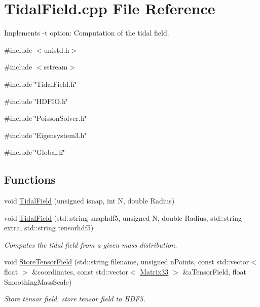 \section{TidalField.cpp File Reference}
\label{TidalField_8cpp}


Implements -\/t option: Computation of the tidal field.  


{\ttfamily \#include $<$unistd.h$>$}\par
{\ttfamily \#include $<$sstream$>$}\par
{\ttfamily \#include \char`\"{}TidalField.h\char`\"{}}\par
{\ttfamily \#include \char`\"{}HDFIO.h\char`\"{}}\par
{\ttfamily \#include \char`\"{}PoissonSolver.h\char`\"{}}\par
{\ttfamily \#include \char`\"{}Eigensystem3.h\char`\"{}}\par
{\ttfamily \#include \char`\"{}Global.h\char`\"{}}\par
\subsection*{Functions}
\begin{DoxyCompactItemize}
\item 
void \hyperlink{TidalField_8cpp_ad67677b74fe6123a6f5403a9610aba03}{TidalField} (unsigned isnap, int N, double Radius)
\item 
void \hyperlink{TidalField_8cpp_abb7805a812bc26fb645ef7cc1790a8d0}{TidalField} (std::string snaphdf5, unsigned N, double Radius, std::string extra, std::string tensorhdf5)
\begin{DoxyCompactList}\small\item\em Computes the tidal field from a given mass distribution. \item\end{DoxyCompactList}\item 
void \hyperlink{TidalField_8cpp_a4148c344aade56863506eafe83d9161e}{StoreTensorField} (std::string filename, unsigned nPoints, const std::vector$<$ float $>$ \&coordinates, const std::vector$<$ \hyperlink{classMatrix33}{Matrix33} $>$ \&aTensorField, float SmoothingMassScale)
\begin{DoxyCompactList}\small\item\em Store tensor field. store tensor field to HDF5. \item\end{DoxyCompactList}\end{DoxyCompactItemize}
